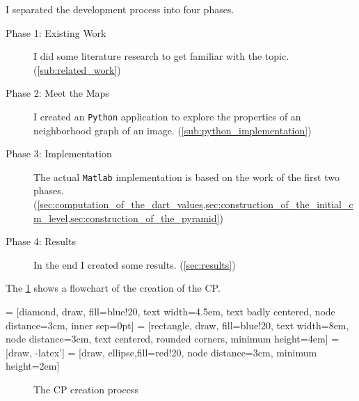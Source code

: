 \documentclass[12pt]{article}
\begin{document}
I separated the development process into four phases.

\begin{description}
  \item[Phase 1: Existing Work] I did some literature research to get familiar with the topic. (\cref{sub:related_work})
  \item[Phase 2: Meet the Maps] I created an \texttt{Python} application to explore the properties of an neighborhood graph of an image. (\cref{sub:python_implementation})
  \item[Phase 3: Implementation] The actual \texttt{Matlab} implementation is based on the work of the first two phases. (\cref{sec:computation_of_the_dart_values,sec:construction_of_the_initial_cm_level,sec:construction_of_the_pyramid})
  \item[Phase 4: Results] In the end I created some results. (\cref{sec:results})
\end{description}

The \cref{fig:cp_creation_process} shows a flowchart of the creation of the CP\@.

 = [diamond, draw, fill=blue!20,
    text width=4.5em, text badly centered, node distance=3cm, inner sep=0pt]
 = [rectangle, draw, fill=blue!20,
    text width=8em, node distance=3cm, text centered, rounded corners, minimum height=4em]
 = [draw, -latex']
 = [draw, ellipse,fill=red!20, node distance=3cm,
    minimum height=2em]
\begin{figure}[tb]
  \centering
  \caption{The CP creation process}
  \label{fig:cp_creation_process}
\end{figure}
\end{document}
